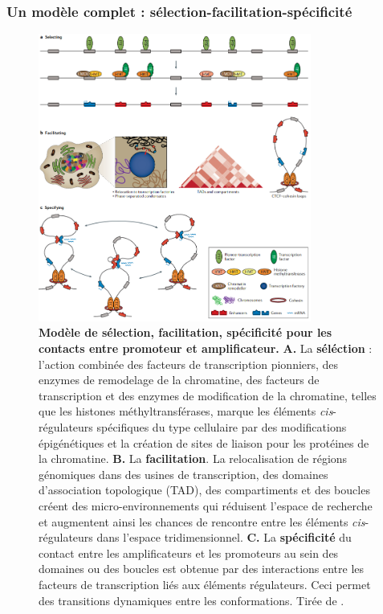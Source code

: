 \subsubsection{Un modèle complet : sélection-facilitation-spécificité}
\label{subsubsec:modele-complet}

\begin{figure}[H]
    \centering
    \includegraphics[width=0.8\textwidth, page=1] {figures/introduction/fig14.png}
    \caption[Modèle de sélection, facilitation, spécificité pour les contacts entre promoteur et amplificateur.]{
    \textbf{Modèle de sélection, facilitation, spécificité pour les contacts entre promoteur et amplificateur.}
    \textbf{A.} La \textbf{séléction} : l'action combinée des facteurs de transcription pionniers, des enzymes de remodelage de la chromatine, des facteurs de transcription et des enzymes de modification de la chromatine, telles que les histones méthyltransférases, marque les éléments \textit{cis}-régulateurs spécifiques du type cellulaire par des modifications épigénétiques et la création de sites de liaison pour les protéines de la chromatine. \textbf{B.} La \textbf{facilitation}. La relocalisation de régions génomiques dans des usines de transcription, des domaines d'association topologique (TAD), des compartiments et des boucles créent des micro-environnements qui réduisent l'espace de recherche et augmentent ainsi les chances de rencontre entre les éléments \textit{cis}-régulateurs dans l'espace tridimensionnel. \textbf{C.} La \textbf{spécificité} du contact entre les amplificateurs et les promoteurs au sein des domaines ou des boucles est obtenue par des interactions entre les facteurs de transcription liés aux éléments régulateurs. Ceci permet des transitions dynamiques entre les conformations.
    Tirée de \citep{schoenfelder_long-range_2019}.\\
    }
    \label{fig:Fig14}
\end{figure}


